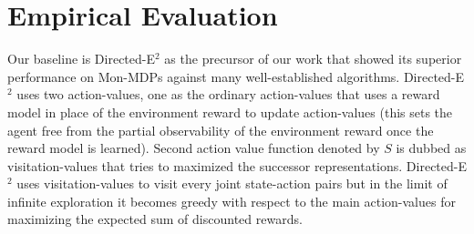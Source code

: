 \section{Empirical Evaluation}
\label{appendix:empirical _details}
Our baseline is Directed-E$^2$ as the precursor of our work that \citet{parisi2024beyond} showed its superior performance on Mon-MDPs against many well-established algorithms. Directed-E$^2$ uses two action-values, one as the ordinary action-values that uses a reward model in place of the environment reward to update action-values (this sets the agent free from the partial observability of the environment reward once the reward model is learned). Second action value function denoted by $S$ is dubbed as visitation-values that tries to maximized the successor representations. Directed-E$^2$ uses visitation-values to visit every joint state-action pairs but in the limit of infinite exploration it becomes greedy with respect to the main action-values for maximizing the expected sum of discounted rewards. 

